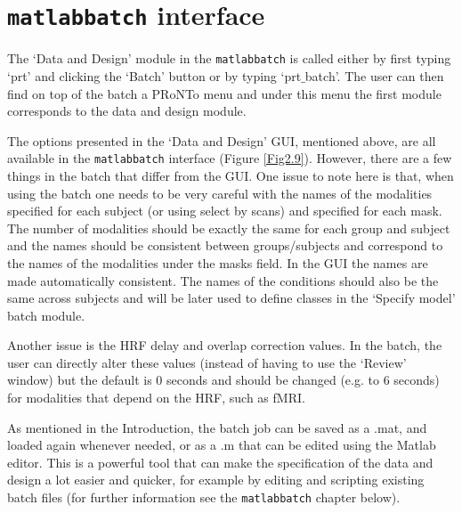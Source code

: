 \section{{\tt matlabbatch} interface}

The `Data and Design' module in the {\tt matlabbatch} is called either by first typing `prt' and clicking the `Batch' button or by typing `prt$\_$batch'. The user can then find on top of the batch a PRoNTo menu and under this menu the first module corresponds to the data and design module.

The options presented in the `Data and Design' GUI, mentioned above, are all available in the {\tt matlabbatch} interface (Figure \ref{Fig2.9}). However, there are a few things in the batch that differ from the GUI. One issue to note here is that, when using the batch one needs to be very careful with the names of the modalities specified for each subject (or using select by scans) and specified for each mask. The number of modalities should be exactly the same for each group and subject and the names should be consistent between groups/subjects and correspond to the names of the modalities under the masks field. In the GUI the names are made automatically consistent. The names of the conditions should also be the same across subjects and will be later used to define classes in the `Specify model' batch module.

Another issue is the HRF delay and overlap correction values. In the batch, the user can directly alter these values (instead of having to use the `Review' window) but the default is 0 seconds and should be changed (e.g. to 6 seconds) for modalities that depend on the HRF, such as fMRI.

As mentioned in the Introduction, the batch job can be saved as a .mat, and loaded again whenever needed, or as a .m that can be edited using the Matlab editor. This is a powerful tool that can make the specification of the data and design a lot easier and quicker, for example by editing and scripting existing batch files (for further information see the {\tt matlabbatch} chapter below).

